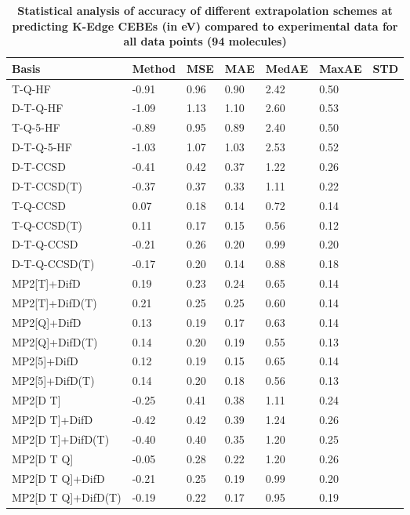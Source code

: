 \begin{table}
  \caption{\textbf{Statistical analysis of accuracy of different extrapolation schemes at predicting K-Edge CEBEs (in eV) compared to experimental data for all data points (94 molecules)}}
  \label{tbl:extrap-all-summary}
  \begin{tabular}{l l l l l l l }
    \hline
    \textbf{Basis} & \textbf{Method} & \textbf{MSE} & \textbf{MAE} & \textbf{MedAE} & \textbf{MaxAE} & \textbf{STD} \\ 
    \hline
    T-Q-HF & -0.91 & 0.96 & 0.90 & 2.42 & 0.50 \\ 
    D-T-Q-HF & -1.09 & 1.13 & 1.10 & 2.60 & 0.53 \\ 
    T-Q-5-HF & -0.89 & 0.95 & 0.89 & 2.40 & 0.50 \\ 
    D-T-Q-5-HF & -1.03 & 1.07 & 1.03 & 2.53 & 0.52 \\ 
    D-T-CCSD & -0.41 & 0.42 & 0.37 & 1.22 & 0.26 \\ 
    D-T-CCSD(T) & -0.37 & 0.37 & 0.33 & 1.11 & 0.22 \\ 
    T-Q-CCSD & 0.07 & 0.18 & 0.14 & 0.72 & 0.14 \\ 
    T-Q-CCSD(T) & 0.11 & 0.17 & 0.15 & 0.56 & 0.12 \\ 
    D-T-Q-CCSD & -0.21 & 0.26 & 0.20 & 0.99 & 0.20 \\ 
    D-T-Q-CCSD(T) & -0.17 & 0.20 & 0.14 & 0.88 & 0.18 \\ 
    MP2[T]+DifD & 0.19 & 0.23 & 0.24 & 0.65 & 0.14 \\ 
    MP2[T]+DifD(T) & 0.21 & 0.25 & 0.25 & 0.60 & 0.14 \\ 
    MP2[Q]+DifD & 0.13 & 0.19 & 0.17 & 0.63 & 0.14 \\ 
    MP2[Q]+DifD(T) & 0.14 & 0.20 & 0.19 & 0.55 & 0.13 \\ 
    MP2[5]+DifD & 0.12 & 0.19 & 0.15 & 0.65 & 0.14 \\ 
    MP2[5]+DifD(T) & 0.14 & 0.20 & 0.18 & 0.56 & 0.13 \\ 
    MP2[D T] & -0.25 & 0.41 & 0.38 & 1.11 & 0.24 \\ 
    MP2[D T]+DifD & -0.42 & 0.42 & 0.39 & 1.24 & 0.26 \\ 
    MP2[D T]+DifD(T) & -0.40 & 0.40 & 0.35 & 1.20 & 0.25 \\ 
    MP2[D T Q] & -0.05 & 0.28 & 0.22 & 1.20 & 0.26 \\ 
    MP2[D T Q]+DifD & -0.21 & 0.25 & 0.19 & 0.99 & 0.20 \\ 
    MP2[D T Q]+DifD(T) & -0.19 & 0.22 & 0.17 & 0.95 & 0.19 \\ 

\end{tabular}
\end{table}
